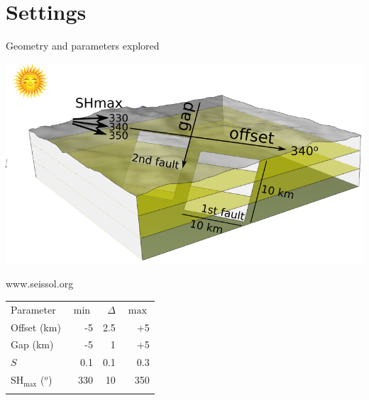 \documentclass{beamer}
\begin{document}
\section{Settings}

\begin{frame}
 {Geometry and parameters explored}

 \vskip -0.2cm
  \includegraphics[width=1\linewidth]{images/model_no_table}
 \begin{minipage}{0.45\linewidth}
   {\scriptsize www.seissol.org} \\ {\tiny \citep[e.g.,][]{Wollherr_2018_OFP, Ulrich_2019_CPB}}
 \end{minipage}
 \begin{minipage}{0.45\linewidth}
 \hskip 2cm \vskip -0.7cm \begin{tabular}{l | r | r | r}
  Parameter           & $\min$ & $\Delta$ & $\max$  \\ \pause
  Offset (km)         & -5     & 2.5      & +5      \\ \pause
  Gap (km)            & -5     & 1        & +5      \\ \pause
  $S$                 & 0.1    & 0.1      & 0.3     \\ \pause
  SH$_{\max}$ ($^o$)  & 330    & 10       & 350     \\ \pause
 \end{tabular}
 \end{minipage}

\end{frame}
\end{document}
